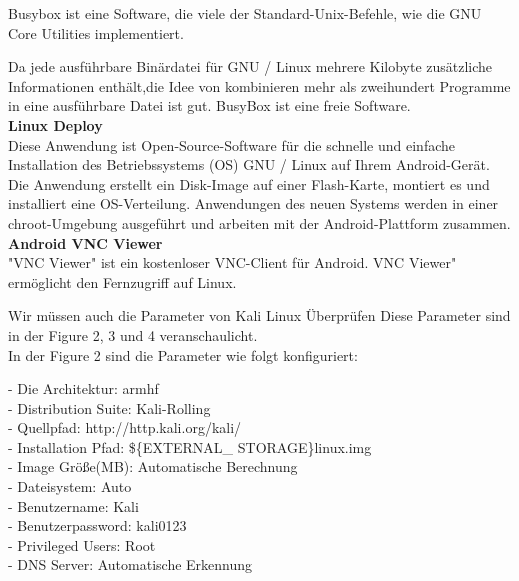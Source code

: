 \documentclass[11pt,a4paper]{article}
\begin{document}
Busybox ist eine Software, die viele der Standard-Unix-Befehle, wie die GNU Core Utilities implementiert.

Da jede ausführbare Binärdatei für GNU / Linux mehrere Kilobyte zusätzliche Informationen enthält,die Idee von kombinieren  mehr als zweihundert Programme in eine ausführbare Datei ist gut.
BusyBox ist eine freie Software. \\
 
 
\textbf{Linux Deploy} \\

Diese Anwendung ist Open-Source-Software für die schnelle und einfache Installation des Betriebssystems (OS) GNU / Linux auf Ihrem Android-Gerät. \\

Die Anwendung erstellt ein Disk-Image auf einer Flash-Karte, montiert es und installiert eine OS-Verteilung. Anwendungen des neuen Systems werden in einer chroot-Umgebung ausgeführt und arbeiten mit der Android-Plattform zusammen. \\



 \textbf{Android VNC Viewer} \\
 "VNC Viewer" ist ein kostenloser VNC-Client für Android. 
 VNC Viewer" ermöglicht den Fernzugriff auf Linux.

       
Wir müssen auch die Parameter von Kali Linux Überprüfen 
Diese Parameter sind in der Figure 2, 3 und 4 veranschaulicht.\\ 

In der Figure 2 sind die Parameter wie folgt konfiguriert:

- Die Architektur: armhf \\
- Distribution Suite: Kali-Rolling \\
- Quellpfad: http://http.kali.org/kali/ \\
- Installation Pfad: \$\{EXTERNAL\_ STORAGE\}\/linux.img  \\
- Image Größe(MB): Automatische Berechnung \\
- Dateisystem: Auto \\
- Benutzername: Kali \\
- Benutzerpassword: kali0123 \\
- Privileged Users: Root \\
- DNS Server: Automatische Erkennung \\
\end{document}
